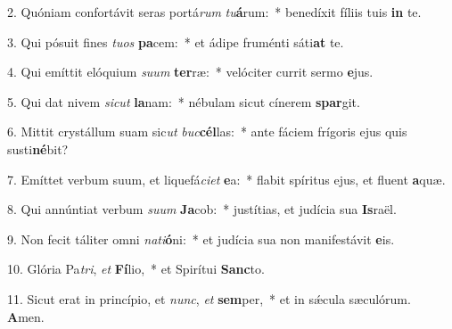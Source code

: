 2. Quóniam confortávit seras portá\textit{rum} \textit{tu}\textbf{á}rum:~*  benedíxit fíliis tuis \textbf{in} te.\

3. Qui pósuit fines \textit{tu}\textit{os} \textbf{pa}cem:~*  et ádipe fruménti sáti\textbf{at} te.\

4. Qui emíttit elóquium \textit{su}\textit{um} \textbf{ter}ræ:~*  velóciter currit sermo \textbf{e}jus.\

5. Qui dat nivem \textit{sic}\textit{ut} \textbf{la}nam:~*  nébulam sicut cínerem \textbf{spar}git.\

6. Mittit crystállum suam sic\textit{ut} \textit{buc}\textbf{cél}las:~*  ante fáciem frígoris ejus quis susti\textbf{né}bit?\

7. Emíttet verbum suum, et liquefá\textit{ci}\textit{et} \textbf{e}a:~*  flabit spíritus ejus, et fluent \textbf{a}quæ.\

8. Qui annúntiat verbum \textit{su}\textit{um} \textbf{Ja}cob:~*  justítias, et judícia sua \textbf{Is}raël.\

9. Non fecit táliter omni \textit{na}\textit{ti}\textbf{ó}ni:~*  et judícia sua non manifestávit \textbf{e}is.\

10. Glória Pa\textit{tri}, \textit{et} \textbf{Fí}lio,~*  et Spirítui \textbf{Sanc}to.\

11. Sicut erat in princípio, et \textit{nunc}, \textit{et} \textbf{sem}per,~*  et in sǽcula sæculórum. \textbf{A}men.\

